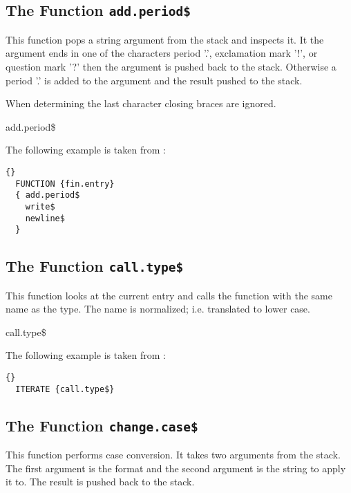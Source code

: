 \subsection{The Function \texttt{add.period\$}}%

This function pops a string argument from the stack and inspects it.
It the argument ends in one of the characters period '.', exclamation
mark '!', or question mark '?' then the argument is pushed back to the
stack. Otherwise a period '.' is added to the argument and the result
pushed to the stack.

When determining the last character closing braces are ignored.

\begin{BstFunction}{add.period\$}
\end{BstFunction}

The following example is taken from :

\begin{lstlisting}{}
  FUNCTION {fin.entry}
  { add.period$
    write$
    newline$
  }
\end{lstlisting}


\subsection{The Function \texttt{call.type\$}}%

This function looks at the current entry and calls the function
with the same name as the type. The name is normalized; i.e.
translated to lower case.

\begin{BstFunction}{call.type\$}
\end{BstFunction}

The following example is taken from :

\begin{lstlisting}{}
  ITERATE {call.type$}
\end{lstlisting}


\subsection{The Function \texttt{change.case\$}}%

This function performs case conversion. It takes two arguments from
the stack. The first argument is the format and the second argument is
the string to apply it to. The result is pushed back to the stack.

